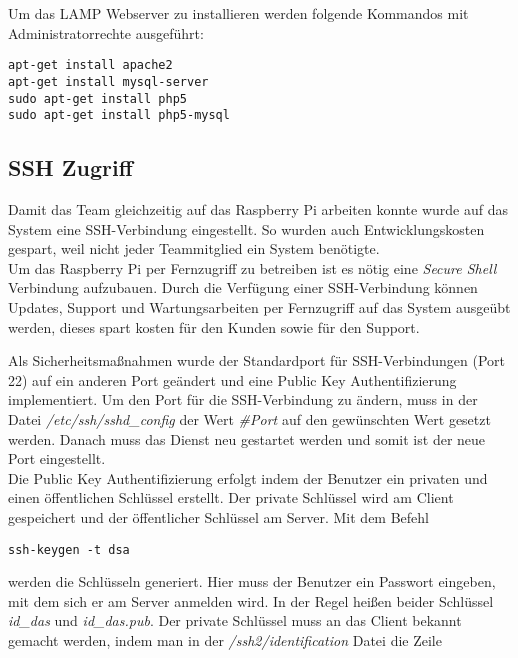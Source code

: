 Um das LAMP Webserver zu installieren werden folgende Kommandos mit Administratorrechte ausgeführt:\\
\begin{lstlisting}
apt-get install apache2
apt-get install mysql-server
sudo apt-get install php5
sudo apt-get install php5-mysql
\end{lstlisting}

\subsection{SSH Zugriff}
Damit das Team gleichzeitig auf das Raspberry Pi arbeiten konnte wurde auf das System eine SSH-Verbindung eingestellt. So wurden auch Entwicklungskosten gespart, weil nicht jeder Teammitglied ein System benötigte.\\

Um das Raspberry Pi per Fernzugriff zu betreiben ist es nötig eine \textit{Secure Shell} Verbindung aufzubauen. Durch die Verfügung einer SSH-Verbindung können Updates, Support und Wartungsarbeiten per Fernzugriff auf das System ausgeübt werden, dieses spart kosten für den Kunden sowie für den Support.

Als Sicherheitsmaßnahmen wurde der Standardport für SSH-Verbindungen (Port 22) auf ein anderen Port geändert und eine Public Key Authentifizierung implementiert. Um den Port für die SSH-Verbindung zu ändern, muss in der Datei \textit{/etc/ssh/sshd\_config} der Wert \textit{\#Port} auf den gewünschten Wert gesetzt werden. Danach muss das Dienst neu gestartet werden und somit ist der neue Port eingestellt.\\

Die Public Key Authentifizierung erfolgt indem der Benutzer ein privaten und einen öffentlichen Schlüssel erstellt. Der private Schlüssel wird am Client gespeichert und der öffentlicher Schlüssel am Server. Mit dem Befehl

\begin{lstlisting}
ssh-keygen -t dsa
\end{lstlisting}

werden die Schlüsseln generiert. Hier muss der Benutzer ein Passwort eingeben, mit dem sich er am Server anmelden wird. In der Regel heißen beider Schlüssel \textit{id\_das} und \textit{id\_das.pub}. Der private Schlüssel muss an das Client bekannt gemacht werden, indem man in der \textit{/ssh2/identification} Datei die Zeile 

